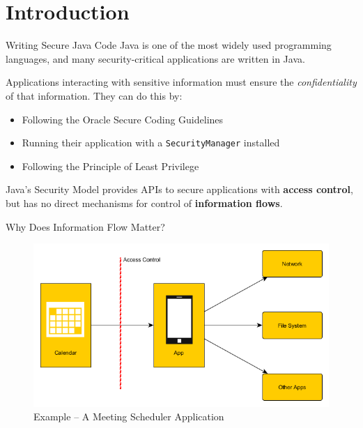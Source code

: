 \section{Introduction}

\begin{frame}{Writing Secure Java Code}
	Java is one of the most widely used programming languages, and many security-critical applications are written in Java.
	
	Applications interacting with sensitive information must ensure the \textit{confidentiality} of that information. They can do this by:
	
	\begin{itemize}
		\item Following the Oracle Secure Coding Guidelines
		\item Running their application with a \texttt{SecurityManager} installed
		\item Following the Principle of Least Privilege
	\end{itemize}
	
	Java's Security Model provides APIs to secure applications with \textbf{access control}, but has no direct mechanisms for control of \textbf{information flows}.
\end{frame}

\begin{frame}{Why Does Information Flow Matter?}

	\begin{figure}
		\includegraphics[scale=0.5]{content/images/calendar_flow.png}
		\caption{Example -- A Meeting Scheduler Application}
	\end{figure}
	
\end{frame}

